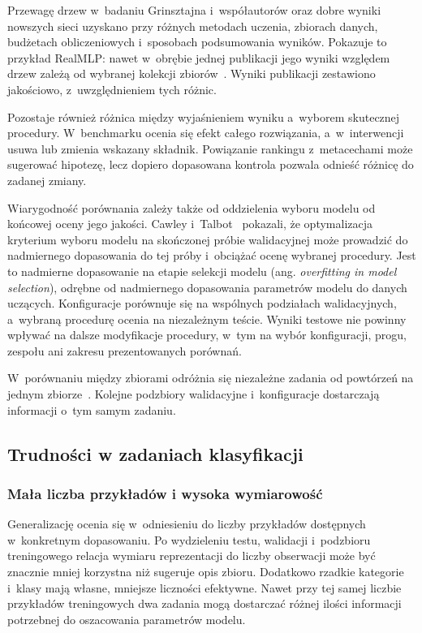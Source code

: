 Przewagę drzew w~badaniu Grinsztajna i~współautorów oraz dobre wyniki nowszych sieci uzyskano przy różnych metodach uczenia, zbiorach danych, budżetach obliczeniowych i~sposobach podsumowania wyników. Pokazuje to przykład RealMLP: nawet w~obrębie jednej publikacji jego wyniki względem drzew zależą od wybranej kolekcji zbiorów~\cite{grinsztajn2022trees,holzmueller2024realmlp}. Wyniki publikacji zestawiono jakościowo, z~uwzględnieniem tych różnic.

Pozostaje również różnica między wyjaśnieniem wyniku a~wyborem skutecznej procedury. W~benchmarku ocenia się efekt całego rozwiązania, a~w~interwencji usuwa lub zmienia wskazany składnik. Powiązanie rankingu z~metacechami może sugerować hipotezę, lecz dopiero dopasowana kontrola pozwala odnieść różnicę do zadanej zmiany.

Wiarygodność porównania zależy także od oddzielenia wyboru modelu od końcowej oceny jego jakości. Cawley i~Talbot~\cite{cawley2010selection} pokazali, że optymalizacja kryterium wyboru modelu na skończonej próbie walidacyjnej może prowadzić do nadmiernego dopasowania do tej próby i~obciążać ocenę wybranej procedury. Jest to nadmierne dopasowanie na etapie selekcji modelu (ang. \textit{overfitting in model selection}), odrębne od nadmiernego dopasowania parametrów modelu do danych uczących. Konfiguracje porównuje się na wspólnych podziałach walidacyjnych, a~wybraną procedurę ocenia na niezależnym teście. Wyniki testowe nie powinny wpływać na dalsze modyfikacje procedury, w~tym na wybór konfiguracji, progu, zespołu ani zakresu prezentowanych porównań.

W~porównaniu między zbiorami odróżnia się niezależne zadania od powtórzeń na jednym zbiorze~\cite{demsar2006comparisons}. Kolejne podzbiory walidacyjne i~konfiguracje dostarczają informacji o~tym samym zadaniu.

\subsection{Trudności w zadaniach klasyfikacji}
\label{sec:trudne-rezimy}

\subsubsection{Mała liczba przykładów i wysoka wymiarowość}

Generalizację ocenia się w~odniesieniu do liczby przykładów dostępnych w~konkretnym dopasowaniu. Po wydzieleniu testu, walidacji i~podzbioru treningowego relacja wymiaru reprezentacji do liczby obserwacji może być znacznie mniej korzystna niż sugeruje opis zbioru. Dodatkowo rzadkie kategorie i~klasy mają własne, mniejsze liczności efektywne. Nawet przy tej samej liczbie przykładów treningowych dwa zadania mogą dostarczać różnej ilości informacji potrzebnej do oszacowania parametrów modelu.


